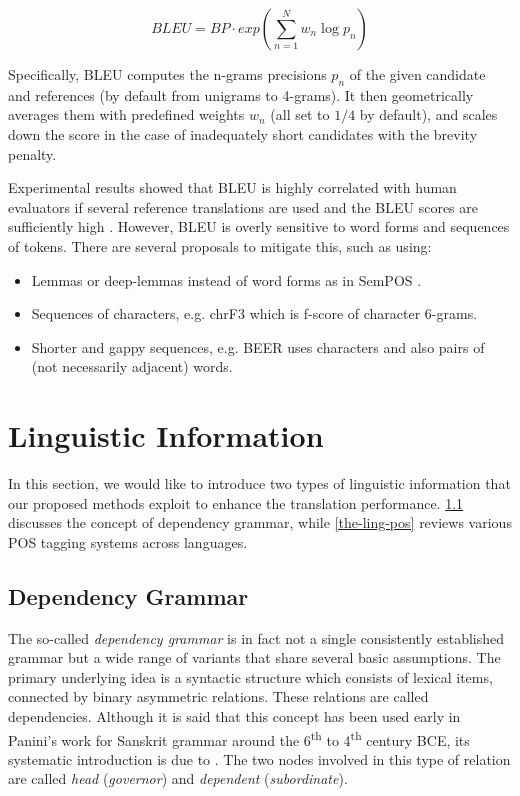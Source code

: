 \begin{equation}
    BLEU=BP\cdot exp\left( \sum_{n=1}^{N} w_n \log p_n \right)
\end{equation}

Specifically, BLEU computes the n-grams precisions $p_n$ of the given candidate and references (by default from unigrams to 4-grams).
It then geometrically averages them with predefined weights $w_n$ (all set to $1/4$ by default), and scales down the score in the case of inadequately short candidates with the brevity penalty.

Experimental results showed that BLEU is highly correlated with human evaluators if several reference translations are used and the BLEU scores are sufficiently high \citep{bojar2010tackling}.
However, BLEU is overly sensitive to word forms and sequences of tokens.
There are several proposals to mitigate this, such as using:

\begin{itemize}
    \item Lemmas or deep-lemmas instead of word forms as in SemPOS \citep{Kos09evaluationof}.
    \item Sequences of characters, e.g. chrF3 \citep{chrf3} which is f-score of character 6-grams.
    \item Shorter and gappy sequences, e.g. BEER \citep{beer} uses characters and also pairs of (not necessarily adjacent) words.

\end{itemize}

\section{Linguistic Information}
\label{the-ling}

In this section, we would like to introduce two types of linguistic information that our proposed methods exploit to enhance the translation performance.
\cref{the-ling-dep} discusses the concept of dependency grammar, while \cref{the-ling-pos} reviews various POS tagging systems across languages.

\subsection{Dependency Grammar}
\label{the-ling-dep}

The so-called \textit{dependency grammar} is in fact not a single consistently established grammar but a wide range of variants that share several basic assumptions.
The primary underlying idea is a syntactic structure which consists of lexical items, connected by binary asymmetric relations. 
These relations are called dependencies. 
Although it is said that this concept has been used early in Panini’s work for Sanskrit grammar around the 6\textsuperscript{th} to 4\textsuperscript{th} century BCE, its systematic introduction is due to \cite{lucien1959elements}. 
The two nodes involved in this type of relation are called \textit{head} (\textit{governor})  and \textit{dependent} (\textit{subordinate}).

